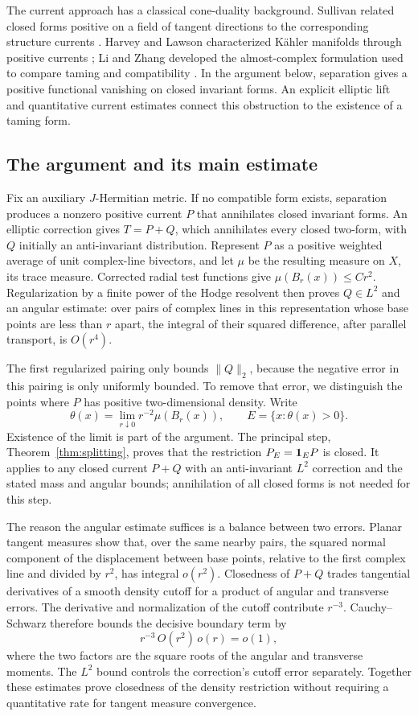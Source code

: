 The current approach has a classical cone-duality background.
Sullivan related closed forms positive on a field of tangent directions
to the corresponding structure currents \cite{Sullivan1976}.
Harvey and Lawson characterized K\"ahler manifolds through positive
currents \cite{HarveyLawson1983}; Li and Zhang developed the
almost-complex formulation used to compare taming and compatibility
\cite[Section~3]{LiZhang2009}.
In the argument below, separation gives a positive functional vanishing
on closed invariant forms. An explicit elliptic lift and quantitative
current estimates connect this obstruction to the existence
of a taming form.

\subsection*{The argument and its main estimate}

Fix an auxiliary \(J\)-Hermitian metric. If no compatible form
exists, separation produces a nonzero positive current \(P\)
that annihilates closed invariant forms. An elliptic correction
gives \(T=P+Q\), which annihilates every closed two-form, with
\(Q\) initially an anti-invariant distribution. Represent \(P\)
as a positive weighted average of unit complex-line bivectors,
and let \(\mu\) be the resulting measure on \(X\), its trace measure.
Corrected radial test functions give \(\mu(B_r(x))\le Cr^2\).
Regularization by a finite power of the Hodge resolvent then
proves \(Q\in L^2\) and an angular estimate: over pairs of
complex lines in this representation whose base points are
less than \(r\) apart, the integral of their squared difference,
after parallel transport, is \(O(r^4)\).

The first regularized pairing only bounds \(\|Q\|_2\), because
the negative error in this pairing is only uniformly bounded.
To remove that error, we distinguish the points where \(P\)
has positive two-dimensional density. Write
\[
\theta(x)=\lim_{r\downarrow0}r^{-2}\mu(B_r(x)),
\qquad E=\{x:\theta(x)>0\}.
\]
Existence of the limit is part of the argument. The principal
step, Theorem~\ref{thm:splitting}, proves that the restriction
\(P_E=\mathbf 1_E P\) is closed. It applies to any closed current
\(P+Q\) with an anti-invariant \(L^2\) correction and the stated
mass and angular bounds; annihilation of all closed forms is
not needed for this step.

The reason the angular estimate suffices is a balance between
two errors. Planar tangent measures show that, over the same
nearby pairs, the squared normal component of the displacement
between base points, relative to the first complex line and divided
by \(r^2\), has integral \(o(r^2)\).
Closedness of \(P+Q\) trades tangential derivatives of a smooth
density cutoff for a product of angular and transverse errors.
The derivative and normalization of the cutoff contribute
\(r^{-3}\). Cauchy--Schwarz therefore bounds the decisive
boundary term by
\[
r^{-3}\,O(r^2)\,o(r)=o(1),
\]
where the two factors are the square roots of the angular and
transverse moments. The \(L^2\) bound controls the correction's
cutoff error separately. Together these estimates prove closedness
of the density restriction without requiring a quantitative rate
for tangent measure convergence.

